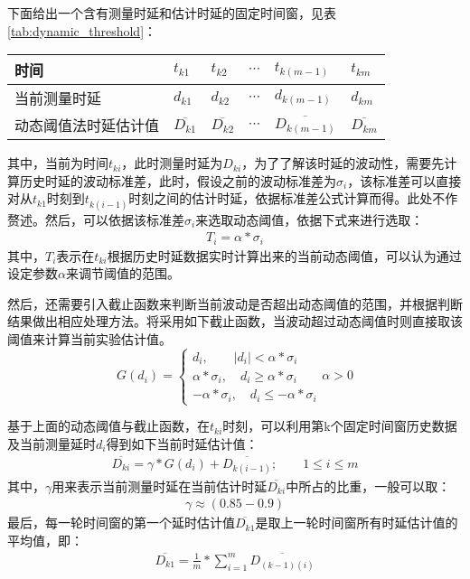 下面给出一个含有测量时延和估计时延的固定时间窗，见表\ref{tab:dynamic_threshold}：
\begin{table}[!hpb]
  \centering
  \begin{tabular}{llllll} \toprule
  	时间 & $t_{k1}$ & $t_{k2}$ & $\cdots$ & $t_{k(m-1)}$ & $t_{km}$ \\ \midrule
    当前测量时延 & $d_{k1}$ & $d_{k2}$ & $\cdots$ & $d_{k(m-1)}$ & $d_{km}$ \\ \midrule
    动态阈值法时延估计值 & $\overline{D_{k1}}$ & $\overline{D_{k2}}$ & $\cdots$ & $\overline{D_{k(m-1)}}$ & $\overline{D_{km}}$  \\ \bottomrule
  \end{tabular}
\end{table}

其中，当前为时间$t_{ki}$，此时测量时延为$D_{ki}$，为了了解该时延的波动性，需要先计算历史时延的波动标准差，此时，假设之前的波动标准差为$\sigma_{i}$，该标准差可以直接对从$t_{k1}$时刻到$t_{k(i-1)}$时刻之间的估计时延，依据标准差公式计算而得。此处不作赘述。然后，可以依据该标准差$\sigma_{i}$来选取动态阈值，依据下式来进行选取：
\begin{align}
T_{i} = \alpha * \sigma_{i}
\end{align}
其中，$T_{i}$表示在$t_{ki}$根据历史时延数据实时计算出来的当前动态阈值，可以认为通过设定参数$\alpha$来调节阈值的范围。

然后，还需要引入截止函数来判断当前波动是否超出动态阈值的范围，并根据判断结果做出相应处理方法。将采用如下截止函数，当波动超过动态阈值时则直接取该阈值来计算当前实验估计值。
\begin{equation}
G(d_{i}) = \left\{
	\begin{array}{lll} %
		d_{i}, \qquad \left | d_{i} \right | < \alpha * \sigma_{i} \\
		\alpha * \sigma_{i}, \quad d_{i} \geq \alpha * \sigma_{i} \\
		-\alpha * \sigma_{i}, \quad d_{i} \leq -\alpha * \sigma_{i}
	\end{array}
	\alpha > 0 \right. 
\end{equation}

基于上面的动态阈值与截止函数，在$t_{ki}$时刻，可以利用第k个固定时间窗历史数据及当前测量延时$d_{i}$得到如下当前时延估计值：
\begin{align}
\overline{D_{ki}} = \gamma * G(d_{i}) + \overline{D_{k(i-1)}}; \qquad 1\leq i \leq m
\end{align}
其中，$\gamma$用来表示当前测量时延在当前估计时延$\overline{D_{ki}}$中所占的比重，一般可以取：
\begin{align}
\gamma \approx (0.85-0.9)
\end{align}
最后，每一轮时间窗的第一个延时估计值$\overline{D_{k1}}$是取上一轮时间窗所有时延估计值的平均值，即：
\begin{align}
\overline{D_{k1}} = \frac{1}{m} * \sum_{i=1}^{m}\overline{D_{(k-1)(i)}}
\end{align}

